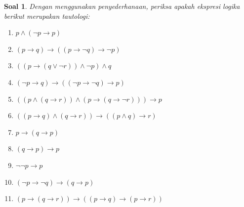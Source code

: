 \documentclass[12pt,a4paper]{article}
\theoremstyle{soaljarak}
\newtheorem{soal}{Soal}
\begin{document}
\begin{soal}
  Dengan menggunakan penyederhanaan, periksa apakah ekspresi logika berikut merupakan tautologi:
  \begin{enumerate}
    \item $p \wedge (\neg p \rightarrow p)$
    \item $(p \rightarrow q)\rightarrow((p \rightarrow \neg q)\rightarrow \neg p)$
    \item $((p \rightarrow (q \vee \neg r))\wedge \neg p)\wedge q$
    \item $(\neg p \rightarrow q)\rightarrow((\neg p \rightarrow \neg q)\rightarrow p)$
    \item $((p \wedge (q \rightarrow r))\wedge(p \rightarrow(q \rightarrow \neg r)))\rightarrow p$
    \item $((p \rightarrow q)\wedge(q \rightarrow r))\rightarrow((p \wedge q)\rightarrow r)$
    \item $p \rightarrow (q \rightarrow p)$
    \item $(q \rightarrow p) \rightarrow p$
    \item $\neg \neg p \rightarrow p$
    \item $(\neg p \rightarrow \neg q)\rightarrow(q \rightarrow p)$
    \item $(p \rightarrow (q \rightarrow r))\rightarrow((p \rightarrow q)\rightarrow(p \rightarrow r))$
  \end{enumerate}
\end{soal}
\end{document}
